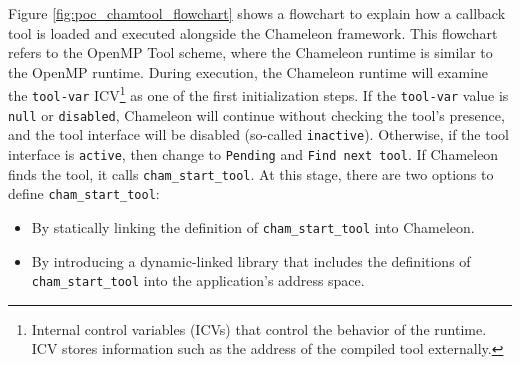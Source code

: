 Figure \ref{fig:poc_chamtool_flowchart} shows a flowchart to explain how a callback tool is loaded and executed alongside the Chameleon framework. This flowchart refers to the OpenMP Tool scheme, where the Chameleon runtime is similar to the OpenMP runtime. During execution, the Chameleon runtime will examine the \texttt{tool-var} ICV\footnote{Internal control variables (ICVs) that control the behavior of the runtime. ICV stores information such as the address of the compiled tool externally.} as one of the first initialization steps. If the \texttt{tool-var} value is \texttt{null} or \texttt{disabled}, Chameleon will continue without checking the tool's presence, and the tool interface will be disabled (so-called \texttt{inactive}). Otherwise, if the tool interface is \texttt{active}, then change to \texttt{Pending} and \texttt{Find next tool}. If Chameleon finds the tool, it calls \texttt{cham\_start\_tool}. At this stage, there are two options to define \texttt{cham\_start\_tool}:
\begin{itemize}
	\item By statically linking the definition of \texttt{cham\_start\_tool} into Chameleon.
	\item By introducing a dynamic-linked library that includes the definitions of \texttt{cham\_start\_tool} into the application's address space.
\end{itemize}

